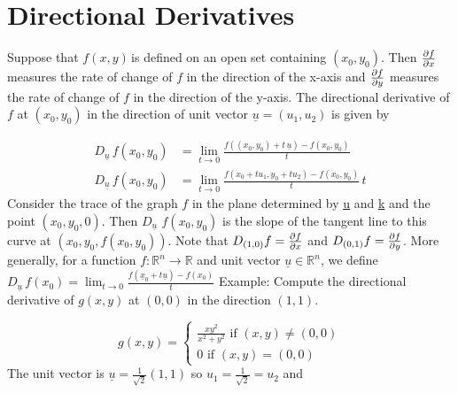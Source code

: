 \documentclass{article}
\newcommand{\n}{\leavevmode \newline} %
\newcommand{\nn}{\leavevmode \newline \newline} %
\newcommand{\R}{\mathbb{R}} %
\newcommand{\fxy}{$f(x,y)\,$} %
\newcommand{\Du}{D_{\underline{u}}\,} %
\numberwithin{equation}{subsection} %
\begin{document}
\section{Directional Derivatives}
Suppose that \fxy is defined on an open set containing $(x_0,y_0)$. Then $\pdv{f}{x}(x_0,y_0)$ measures the rate of change of $f$ in the direction of the x-axis and $\pdv{f}{y}(x_0,y_0)$ measures the rate of change of $f$ in the direction of the y-axis. The directional derivative of $f$ at $(x_0,y_0)$ in the direction of unit vector $\underline{u}=(u_1,u_2)$ is given by

\begin{equation}
    \begin{split}
        \Du f(x_0,y_0)&= \lim_{t\to0} \frac{f((x_0,y_0)+t\,\underline{u})-f(x_0,y_0)}{t}\\
        \Du f(x_0,y_0)&= \lim_{t\to0} \frac{f(x_0+tu_1,y_0+tu_2)-f(x_0,y_0)}{t}\,t
    \end{split}
\end{equation}
\n
Consider the trace of the graph $f$ in the plane determined by \underline{u} and \underline{k} and the point $(x_0,y_0,0)$. Then $\Du\,f(x_0,y_0)$ is the slope of the tangent line to this curve at $(x_0,y_0,f(x_0,y_0))$. Note that $D_{(1,0)}f=\pdv{f}{x}$ and $D_{(0,1)}f=\pdv{f}{y}$.
\nn
More generally, for a function $f:\R^n\to\R$ and unit vector $\underline{u}\in\R^n$, we define $\Du f(x_0)=\lim_{t\to0} \frac{f(\underline{x}_0+t\underline{u})-f(x_0)}{t}$
\nn
Example: Compute the directional derivative of $g(x,y)$ at $(0,0)$ in the direction $(1,1)$.

\begin{equation}
    g(x,y)=\left\{
    \begin{array}{ll}
        \frac{xy^2}{x^2+y^2} \text{ if } (x,y)\neq(0,0)\\
        0 \text{ if } (x,y)=(0,0)
    \end{array}
    \right.
\end{equation}
\n
The unit vector is $\underline{u}=\frac{1}{\sqrt{2}}(1,1)$ so $u_1=\frac{1}{\sqrt{2}}=u_2$ and
\end{document}
